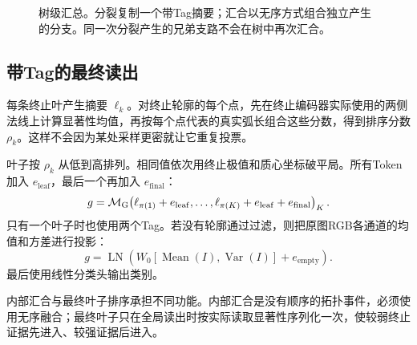 \begin{figure}[t]
    \centering
    
    \caption{树级汇总。分裂复制一个带Tag摘要；汇合以无序方式组合独立产生的分支。同一次分裂产生的兄弟支路不会在树中再次汇合。}
    \label{fig:topology}
\end{figure}

\subsection{带Tag的最终读出}

每条终止叶产生摘要 $\ell_k$。对终止轮廓的每个点，先在终止编码器实际使用的两侧法线上计算显著性均值，再按每个点代表的真实弧长组合这些分数，得到排序分数 $\rho_k$。这样不会因为某处采样更密就让它重复投票。

叶子按 $\rho_k$ 从低到高排列。相同值依次用终止极值和质心坐标破平局。所有Token加入 $e_{\mathrm{leaf}}$，最后一个再加入 $e_{\mathrm{final}}$：
\begin{equation}
g=\mathcal{M}_{\mathrm{G}}\!\left(\ell_{\pi(1)}+e_{\mathrm{leaf}},\ldots,
\ell_{\pi(K)}+e_{\mathrm{leaf}}+e_{\mathrm{final}}\right)_K.
\label{eq:final-zh}
\end{equation}
只有一个叶子时也使用两个Tag。若没有轮廓通过过滤，则把原图RGB各通道的均值和方差进行投影：
\begin{equation}
g=\operatorname{LN}\!\left(W_0[\operatorname{Mean}(I),\operatorname{Var}(I)]+e_{\mathrm{empty}}\right).
\end{equation}
最后使用线性分类头输出类别。

内部汇合与最终叶子排序承担不同功能。内部汇合是没有顺序的拓扑事件，必须使用无序融合；最终叶子只在全局读出时按实际读取显著性序列化一次，使较弱终止证据先进入、较强证据后进入。
